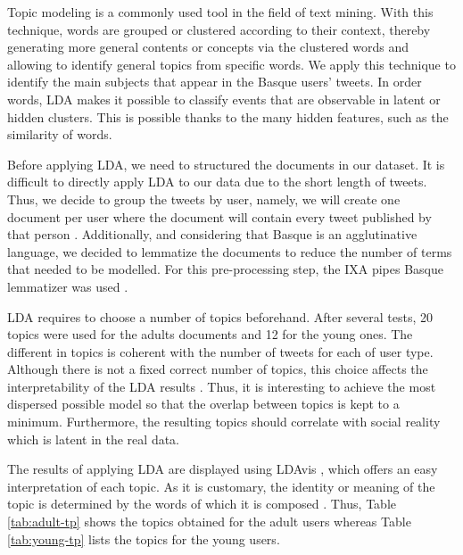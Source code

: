 \documentclass[information,article,submit,moreauthors,pdftex,10pt,a4paper]{Definitions/mdpi}
\begin{document}
Topic modeling is a commonly used tool in the field of text mining. With this technique, words are grouped or clustered according to their context, thereby generating more general contents or concepts via the clustered words and allowing to identify general topics from specific words. We apply this technique to identify the main subjects that appear in the Basque users' tweets. In order words, LDA  makes it possible to classify events that are observable in latent or hidden clusters. This is possible thanks to the many hidden features, such as the similarity of words.

Before applying LDA, we need to structured the documents in our dataset. It is difficult to directly apply LDA to our data due to the short length of tweets. Thus, we decide to group the tweets by user, namely, we will create one document per user where the document will contain every tweet published by that person \cite{hong2010empirical, zhao2011comparing}. Additionally, and considering that Basque is an agglutinative language, we decided to lemmatize the documents to reduce the number of terms that needed to be modelled. For this pre-processing step, the IXA pipes Basque lemmatizer  was used \cite{agerri2014ixa}.

LDA requires to choose a number of topics beforehand. After several tests, 20 topics were used for the adults documents and 12 for the young ones. The different in topics is coherent with the number of tweets for each of user type. Although there is not a fixed correct number of topics, this choice affects the interpretability of the LDA results \cite{binkley2014understanding,steyvers2007probabilistic}. Thus, it is interesting to achieve the most dispersed possible model so that the overlap between topics is kept to a minimum. Furthermore, the resulting topics should correlate with social reality which is latent in the real data.

The results of applying LDA are displayed using LDAvis \cite{sievert2014ldavis}, which offers an easy interpretation of each topic. As it is customary, the identity or meaning of the topic is determined by the words of which it is composed \cite{binkley2014understanding}. Thus, Table \ref{tab:adult-tp} shows the topics obtained for the adult users whereas Table \ref{tab:young-tp} lists the topics for the young users.
\end{document}
